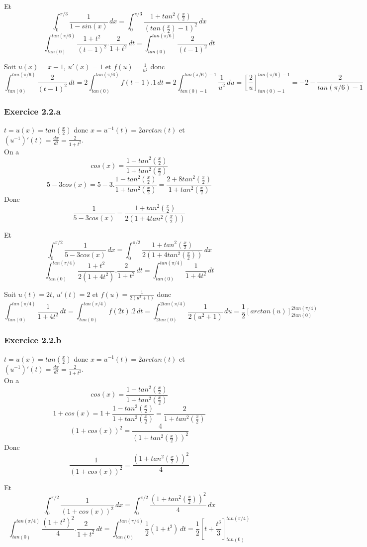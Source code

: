 \documentclass[]{book}
\theoremstyle{definition}
\begin{document}
Et
$$\int_0^{\pi/3}{\frac{1}{1-sin(x)}\,dx} = \int_0^{\pi/3}{\frac{1+tan^2(\frac{x}{2})}{(tan(\frac{x}{2})-1)^2}\,dx}$$
$$\int_{tan(0)}^{tan(\pi/6)}{\frac{1+t^2}{(t-1)^2}.\frac{2}{1+t^2}\,dt} = \int_{tan(0)}^{tan(\pi/6)}{\frac{2}{(t-1)^2}\,dt}$$

Soit $u(x)=x-1$, $u'(x)=1$ et $f(u) = \frac{1}{u^2}$ donc
$$\int_{tan(0)}^{tan(\pi/6)}{\frac{2}{(t-1)^2}\,dt} = 2\int_{tan(0)}^{tan(\pi/6)}{f(t-1).1\,dt}=2\int_{tan(0)-1}^{tan(\pi/6)-1}{\frac{1}{u^2}\,du} = [\frac{2}{u}]_{tan(0)-1}^{tan(\pi/6)-1} = -2 - \frac{2}{tan(\pi/6)-1}$$


\subsubsection*{Exercice 2.2.a}
$t = u(x) = tan(\frac{x}{2})$ donc $x = u^{-1}(t) = 2arctan(t)$ et $(u^{-1})'(t) = \frac{dx}{dt} = \frac{2}{1+t^2}$.\\
On a 
$$cos(x)=\frac{1-tan^2(\frac{x}{2})}{1+tan^2(\frac{x}{2})}$$
$$5-3cos(x)=5-3.\frac{1-tan^2(\frac{x}{2})}{1+tan^2(\frac{x}{2})} = \frac{2+8tan^2(\frac{x}{2})}{1+tan^2(\frac{x}{2})}$$
Donc
$$\frac{1}{5-3cos(x)} = \frac{1+tan^2(\frac{x}{2})}{2(1+4tan^2(\frac{x}{2}))}$$

Et
$$\int_{0}^{\pi/2}{\frac{1}{5-3cos(x)}\,dx} = \int_{0}^{\pi/2}{\frac{1+tan^2(\frac{x}{2})}{2(1+4tan^2(\frac{x}{2}))}\,dx}$$
$$\int_{tan(0)}^{tan(\pi/4)}{\frac{1+t^2}{2(1+4t^2)}.\frac{2}{1+t^2}\,dt} = \int_{tan(0)}^{tan(\pi/4)}{\frac{1}{1+4t^2}\,dt}$$

Soit $u(t)=2t$, $u'(t)=2$ et $f(u)=\frac{1}{2(u^2+1)}$ donc
$$\int_{tan(0)}^{tan(\pi/4)}{\frac{1}{1+4t^2}\,dt} = \int_{tan(0)}^{tan(\pi/4)}{f(2t).2\,dt} = \int_{2tan(0)}^{2tan(\pi/4)}{\frac{1}{2(u^2+1)}\,du} = \frac{1}{2}[arctan(u)]_{2tan(0)}^{2tan(\pi/4)}$$


\subsubsection*{Exercice 2.2.b}
$t = u(x) = tan(\frac{x}{2})$ donc $x = u^{-1}(t) = 2arctan(t)$ et $(u^{-1})'(t) = \frac{dx}{dt} = \frac{2}{1+t^2}$.\\
On a 
$$cos(x)=\frac{1-tan^2(\frac{x}{2})}{1+tan^2(\frac{x}{2})}$$
$$1+cos(x)=1+\frac{1-tan^2(\frac{x}{2})}{1+tan^2(\frac{x}{2})} = \frac{2}{1+tan^2(\frac{x}{2})}$$
$$(1+cos(x))^2 = \frac{4}{(1+tan^2(\frac{x}{2}))^2}$$
Donc
$$\frac{1}{(1+cos(x))^2}=\frac{(1+tan^2(\frac{x}{2}))^2}{4}$$

Et
$$\int_{0}^{\pi/2}{\frac{1}{(1+cos(x))^2}\,dx} = \int_{0}^{\pi/2}{\frac{(1+tan^2(\frac{x}{2}))^2}{4}\,dx}$$
$$\int_{tan(0)}^{tan(\pi/4)}{\frac{(1+t^2)^2}{4}.\frac{2}{1+t^2}\,dt} = \int_{tan(0)}^{tan(\pi/4)}{\frac{1}{2}(1+t^2)\,dt} = \frac{1}{2}[t+\frac{t^3}{3}]_{tan(0)}^{tan(\pi/4)}$$
\end{document}

